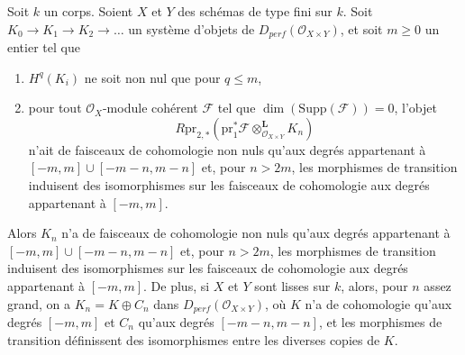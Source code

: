 \begin{lemma}
\label{lemma-bounded-fibres}
Soit $k$ un corps. Soient $X$ et $Y$ des schémas de type fini sur $k$.
Soit $K_0 \to K_1 \to K_2 \to \ldots$ un système d'objets
de $D_{perf}(\mathcal{O}_{X \times Y})$, et soit $m \geq 0$ un entier tel que
\begin{enumerate}
\item $H^q(K_i)$ ne soit non nul que pour $q \leq m$,
\item pour tout $\mathcal{O}_X$-module cohérent $\mathcal{F}$ tel que
$\dim(\text{Supp}(\mathcal{F})) = 0$, l'objet
$$
R\text{pr}_{2, *}(
\text{pr}_1^*\mathcal{F} \otimes_{\mathcal{O}_{X \times Y}}^\mathbf{L}
K_n)
$$
n'ait de faisceaux de cohomologie non nuls qu'aux degrés appartenant à
$[-m, m] \cup [-m - n, m - n]$ et, pour $n > 2m$, les morphismes de transition
induisent des isomorphismes sur les faisceaux de cohomologie aux degrés appartenant à $[-m, m]$.
\end{enumerate}
Alors $K_n$ n'a de faisceaux de cohomologie non nuls qu'aux degrés appartenant à
$[-m, m] \cup [-m - n, m - n]$ et, pour $n > 2m$, les
morphismes de transition induisent des isomorphismes sur les faisceaux de cohomologie aux degrés appartenant à
$[-m, m]$. De plus, si $X$ et $Y$ sont lisses sur $k$, alors, pour $n$
assez grand, on a $K_n = K \oplus C_n$ dans
$D_{perf}(\mathcal{O}_{X \times Y})$,
où $K$ n'a de cohomologie qu'aux degrés $[-m, m]$ et $C_n$ qu'aux
degrés $[-m - n, m - n]$, et les morphismes de transition
définissent des isomorphismes entre les diverses copies de $K$.
\end{lemma}

